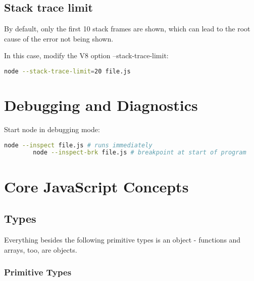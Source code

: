 \documentclass{scrartcl}
\begin{document}
\subsection{Stack trace limit}

    By default, only the first 10 stack frames are shown, which can lead to the root cause of the error not being shown.

    In this case, modify the V8 option --stack-trace-limit:

    \begin{lstlisting}[language=bash]
    node --stack-trace-limit=20 file.js
    \end{lstlisting}

\section{Debugging and Diagnostics}

    Start node in debugging mode:

    \begin{lstlisting}[language=bash]
        node --inspect file.js # runs immediately
        node --inspect-brk file.js # breakpoint at start of program
    \end{lstlisting}

\section{Core JavaScript Concepts}
\subsection{Types}

    Everything besides the following primitive types is an object - functions and arrays, too, are objects.

\subsubsection{Primitive Types}
\end{document}
